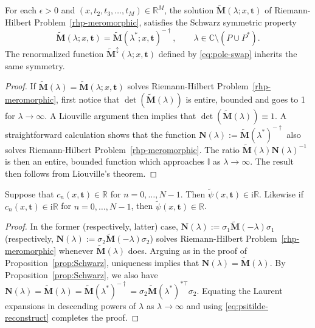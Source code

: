 \documentclass[12pt]{amsart}
\numberwithin{equation}{section}
\newcommand{\ii}{\mathrm{i}}
\newcommand{\SP}{\lambda}
\newcommand{\C}{\mathbb{C}}
\begin{document}
\begin{prop}
For each $\epsilon>0$ and $(x,t_2,t_3,\dots,t_M)\in\mathbb{R}^M$, the solution $\widetilde{\mathbf{M}}(\SP;x,\mathbf{t})$ of Riemann-Hilbert Problem~\ref{rhp-meromorphic}, satisfies the Schwarz symmetric property
\begin{equation}
	\widetilde{\mathbf{M}}(\SP;x,\mathbf{t})
	= \widetilde{\mathbf{M}}(\SP^*;x,\mathbf{t})^{-\dagger}, 
	\qquad \lambda \in \C \setminus (P \cup P^*).
\end{equation}
The renormalized function $\widetilde{\mathbf{M}}^{\updownarrow}(\SP;x,\mathbf{t})$ defined by \eqref{eq:pole-swap} inherits the same symmetry. 
\label{prop:Schwarz}
\end{prop}
\begin{proof}
If $\widetilde{\mathbf{M}}(\SP)=\widetilde{\mathbf{M}}(\SP;x,\mathbf{t})$ solves Riemann-Hilbert Problem~\ref{rhp-meromorphic}, first notice that $\det (\widetilde{\mathbf{M}}(\SP))$ is entire, bounded and goes to 1 for $\SP \to \infty$. A Liouville argument then implies that $\det (\widetilde{\mathbf{M}}(\SP))\equiv 1$. 
A straightforward calculation shows that the function $\mathbf{N}(\lambda) := \widetilde{\mathbf{M}}(\SP^*)^{-\dagger}$ also solves Riemann-Hilbert Problem~\ref{rhp-meromorphic}. 
The ratio $\widetilde{\mathbf{M}}(\SP) \mathbf{N}(\lambda)^{-1}$ is then an entire, bounded function which approaches $\mathbb{I}$ as $\SP \to \infty$. 
The result then follows from Liouville's theorem.
\end{proof}

\begin{prop}
Suppose that $c_n(x,\mathbf{t})\in\mathbb{R}$ for $n=0,\dots,N-1$.  Then $\widetilde{\psi}(x,\mathbf{t})\in\ii\mathbb{R}$.  Likewise if $c_n(x,\mathbf{t})\in\ii\mathbb{R}$ for $n=0,\dots,N-1$, then $\widetilde{\psi}(x,\mathbf{t})\in\mathbb{R}$.
\label{prop:real-imag}
\end{prop}
\begin{proof}
In the former (respectively, latter) case, $\mathbf{N}(\SP):=\sigma_1\widetilde{\mathbf{M}}(-\SP)\sigma_1$ (respectively, $\mathbf{N}(\SP):=\sigma_2\widetilde{\mathbf{M}}(-\SP)\sigma_2$) solves Riemann-Hilbert Problem~\ref{rhp-meromorphic} whenever $\widetilde{\mathbf{M}}(\SP)$ does.  Arguing as in the proof of Proposition~\ref{prop:Schwarz},  uniqueness implies that  $\mathbf{N}(\SP)=\widetilde{\mathbf{M}}(\SP)$.  By Proposition~\ref{prop:Schwarz}, we also have $\mathbf{N}(\SP)=\widetilde{\mathbf{M}}(\SP)=\widetilde{\mathbf{M}}(\SP^*)^{-\dagger}=\sigma_2\widetilde{\mathbf{M}}(\SP^*)^{*\top}\sigma_2$.  Equating the Laurent expansions in descending powers of $\SP$ as $\SP\to\infty$ and using \eqref{eq:psitilde-reconstruct} completes the proof.
\end{proof}
\end{document}
